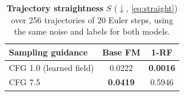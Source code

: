 \begin{table}[t]
  \centering
  \footnotesize
  \caption{\textbf{Trajectory straightness} $S$ ($\downarrow$, \cref{eq:straight}) over 256 trajectories of 20 Euler steps, using the same noise and labels for both models.}
  \label{tab:straight}
  \begin{tabular}{@{}lcc@{}}
    \toprule
    Sampling guidance & Base FM & 1-RF \\
    \midrule
    CFG 1.0 (learned field) & 0.0222 & \textbf{0.0016} \\
    CFG 7.5                 & \textbf{0.0419} & 0.5946 \\
    \bottomrule
  \end{tabular}
\end{table}
